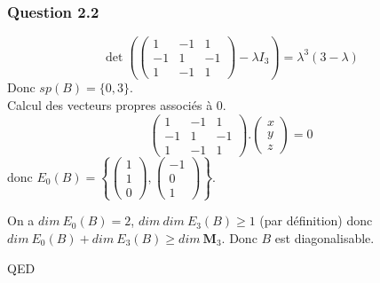 \documentclass[]{book}
\theoremstyle{definition}
\newcommand{\M}{\mathbf{M}}
\begin{document}
\subsubsection*{Question 2.2}
$$\det\left(\begin{pmatrix} 1 & -1 & 1 \\-1 & 1 & -1 \\1 & -1 & 1\end{pmatrix} - \lambda I_3\right) = \lambda^3(3-\lambda)$$
Donc $sp(B) = \{0,3\}$.\\
Calcul des vecteurs propres associ\'es \`a 0.
$$\begin{pmatrix} 1 & -1 & 1 \\-1 & 1 & -1 \\1 & -1 & 1\end{pmatrix} . \begin{pmatrix} x \\ y\\z \end{pmatrix} = 0$$
donc $E_{0}(B)=\left\{ \begin{pmatrix} 1 \\ 1\\0 \end{pmatrix}, \begin{pmatrix} -1 \\ 0\\1 \end{pmatrix} \right\}$.

On a $dim\ E_{0}(B)=2$, $dim\ dim\ E_{3}(B)\geq 1$ (par d\'efinition) donc $dim\ E_{0}(B)+dim\ E_{3}(B) \geq dim\ \M_3$. Donc $B$ est diagonalisable.

QED
\end{document}
